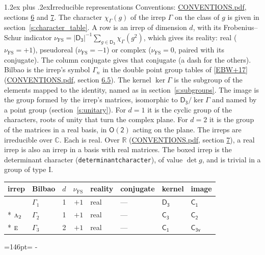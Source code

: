 \documentclass[10pt,a4paper]{article}
\makeatletter
\renewcommand\section{\@startsection{section}{1}{\z@}{-3ex plus -1ex minus -.2ex}%
  {1.2ex plus .2ex}{\normalfont\large\sffamily\bfseries\color{parttitle}}}
\newcommand{\needspace}[1]{\par\penalty-100\begingroup\dimen0=#1\relax\dimen2=\pagegoal
  \advance\dimen2-\pagetotal\ifdim\dimen0>\dimen2\relax\ifdim\dimen2>0pt\vfil\break\fi\fi
  \endgroup}
\numberwithin{equation}{section}
\newcommand{\grp}[1]{\mathsf{#1}}
\newcommand{\irr}[1]{\text{\normalfont\scshape #1}}
\newcommand{\detbox}[1]{{\setlength{\fboxsep}{1pt}\fbox{#1}}}
\newcommand{\irchar}[1]{\chi_{#1}}
\newcommand{\fsind}{\nu_{\mathrm{FS}}}
\makeatother
\begin{document}
\section{Irreducible representations}\label{s:irreps}
Conventions: \href{../../CONVENTIONS.pdf}{CONVENTIONS.pdf}, sections \href{../../CONVENTIONS.pdf\#conv.6}{6} and \href{../../CONVENTIONS.pdf\#conv.7}{7}.
\leavevmode\label{n:function.character}\label{n:irrep.Gamma}The character $\irchar{\Gamma}(g)$ of the irrep $\Gamma$ on the class of $g$ is given in section~\ref{s:character_table}.
\leavevmode\label{n:index.dimension}\label{n:index.frobenius}\label{n:head.irrep}\label{n:head.reality}A row is an irrep of dimension $d$, with its Frobenius--Schur indicator $\fsind = |\grp{D_{3}}|^{-1}\allowbreak\sum_{g\in\grp{D_{3}}}\irchar{\Gamma}(g^2)$, which gives its reality: real ($\fsind = +1$), pseudoreal ($\fsind = -1$) or complex ($\fsind = 0$, paired with its conjugate). \label{n:head.conjugate}The column conjugate gives that conjugate (a dash for the others). \label{n:head.bilbao}\label{n:irrep.alias.gamma}Bilbao is the irrep's symbol $\Gamma_n$ in the double point group tables of [\href{../../../REFERENCES.pdf\#ref.EBW+17}{EBW+17}] (\href{../../CONVENTIONS.pdf}{CONVENTIONS.pdf}, section \href{../../CONVENTIONS.pdf\#conv.6.5}{6.5}). \label{n:head.kernel}The kernel $\ker\Gamma$ is the subgroup of the elements mapped to the identity, named as in section~\ref{s:subgroups}. \label{n:head.image}The image is the group formed by the irrep's matrices, isomorphic to $\grp{D_{3}}/\ker\Gamma$ and named by a point group (section~\ref{s:unitary}). For $d = 1$ it is the cyclic group of the characters, roots of unity that turn the complex plane. For $d = 2$ it is the group of the matrices in a real basis, in $\grp{O(2)}$ acting on the plane. The irreps are irreducible over $\mathbb{C}$. Each is real. Over $\mathbb{R}$ (\href{../../CONVENTIONS.pdf}{CONVENTIONS.pdf}, section \href{../../CONVENTIONS.pdf\#conv.7}{7}), a real irrep is also an irrep in a basis with real matrices. \label{n:mark.determinant}The boxed irrep is the determinant character (\texttt{determinantcharacter}), of value $\det g$, and is trivial in a group of type I.
\setlength{\emergencystretch}{2em}\par\setlength{\emergencystretch}{0pt}
{\small\renewcommand{\arraystretch}{1.25}\begin{longtable}{@{}llrrllll@{}}\toprule
irrep & Bilbao & $d$ & $\fsind$ & reality & conjugate & kernel & image\\\midrule\endhead
\bottomrule\endfoot\endlastfoot
\detbox{$\irr{a}_{1}$} & $\Gamma_{1}$ & 1 & $+1$ & real & --- & \href{D3.pdf}{$\grp{D_{3}}$} & \href{C1.pdf}{$\grp{C_{1}}$}\\*
$\irr{a}_{2}$ & $\Gamma_{2}$ & 1 & $+1$ & real & --- & \href{C3.pdf}{$\grp{C_{3}}$} & \href{C2.pdf}{$\grp{C_{2}}$}\\*
$\irr{e}$ & $\Gamma_{3}$ & 2 & $+1$ & real & --- & \href{C1.pdf}{$\grp{C_{1}}$} & \href{C3v.pdf}{$\grp{C_{3v}}$}\\
\bottomrule\end{longtable}}
\needspace{146pt}
\end{document}
